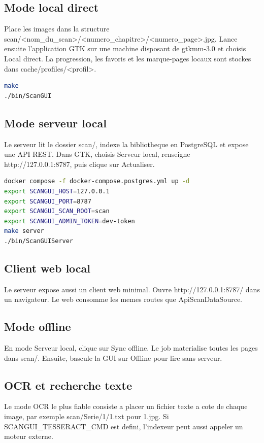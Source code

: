 \documentclass[11pt,a4paper]{article}
\begin{document}
\subsection{Mode local direct}
Place les images dans la structure scan/<nom\_du\_scan>/<numero\_chapitre>/<numero\_page>.jpg. Lance ensuite l'application GTK sur une machine disposant de gtkmm-3.0 et choisis Local direct. La progression, les favoris et les marque-pages locaux sont stockes dans cache/profiles/<profil>.

\begin{lstlisting}[language=bash]
make
./bin/ScanGUI
\end{lstlisting}
\subsection{Mode serveur local}
Le serveur lit le dossier scan/, indexe la bibliotheque en PostgreSQL et expose une API REST. Dans GTK, choisis Serveur local, renseigne http://127.0.0.1:8787, puis clique sur Actualiser.

\begin{lstlisting}[language=bash]
docker compose -f docker-compose.postgres.yml up -d
export SCANGUI_HOST=127.0.0.1
export SCANGUI_PORT=8787
export SCANGUI_SCAN_ROOT=scan
export SCANGUI_ADMIN_TOKEN=dev-token
make server
./bin/ScanGUIServer
\end{lstlisting}
\subsection{Client web local}
Le serveur expose aussi un client web minimal. Ouvre http://127.0.0.1:8787/ dans un navigateur. Le web consomme les memes routes que ApiScanDataSource.

\subsection{Mode offline}
En mode Serveur local, clique sur Sync offline. Le job materialise toutes les pages dans scan/. Ensuite, bascule la GUI sur Offline pour lire sans serveur.

\subsection{OCR et recherche texte}
Le mode OCR le plus fiable consiste a placer un fichier texte a cote de chaque image, par exemple scan/Serie/1/1.txt pour 1.jpg. Si SCANGUI\_TESSERACT\_CMD est defini, l'indexeur peut aussi appeler un moteur externe.
\end{document}
